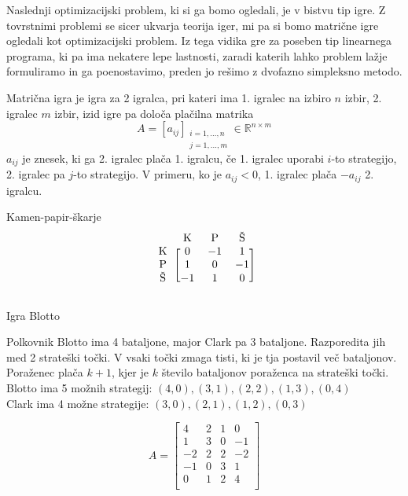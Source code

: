 \documentclass[11pt, a4paper]{article}
\begin{document}
    Naslednji optimizacijski problem, ki si ga bomo ogledali, je v bistvu tip igre. Z tovrstnimi problemi se sicer ukvarja teorija iger, mi pa si bomo matrične igre ogledali kot optimizacijski problem. Iz tega vidika gre za poseben tip linearnega programa, ki pa ima nekatere lepe lastnosti, zaradi katerih lahko problem lažje formuliramo in ga poenostavimo, preden jo rešimo z dvofazno simpleksno metodo.

    \begin{definition}
        Matrična igra je igra za 2 igralca, pri kateri ima 1. igralec na izbiro \(n\) izbir, 2. igralec \(m\) izbir, izid igre pa določa plačilna matrika
        \[A=[a_{ij}]_{\substack{ i=1,...,n \\ j=1,...,m} } \in \mathbb{R}^{n \times m}\]
        \(a_{ij}\) je znesek, ki ga 2. igralec plača 1. igralcu, če 1. igralec uporabi \(i\)-to strategijo, 2. igralec pa \(j\)-to strategijo. V primeru, ko je \(a_{ij} < 0\), 1. igralec plača \(-a_{ij}\) 2. igralcu.
    \end{definition}

    \begin{example}
        Kamen-papir-škarje
        \[
            \begin{blockarray}{c c c c}
                & \text{K} & \text{P} & \text{Š} \\
                \begin{block}{c [c c c]}
                    \text{K} & 0 & -1 & 1 \\
                    \text{P} & 1 & 0 & -1 \\
                    \text{Š} & -1 & 1 & 0 \\
                \end{block}
            \end{blockarray}
        \]
    \end{example}

    \begin{example}
        Igra Blotto
        \par
        Polkovnik Blotto ima 4 bataljone, major Clark pa 3 bataljone. Razporedita jih med 2 strateški točki. V vsaki točki zmaga tisti, ki je tja postavil več bataljonov. Poraženec plača \(k+1\), kjer je \(k\) število bataljonov poraženca na strateški točki. \\
        Blotto ima 5 možnih strategij: \((4,0),(3,1),(2,2),(1,3),(0,4)\) \\
        Clark ima 4 možne strategije: \((3,0),(2,1),(1,2),(0,3)\)
        
        \[
            A=
            \begin{bmatrix}
                4 & 2 & 1 & 0 \\
                1 & 3 & 0 & -1 \\
                -2 & 2 & 2 & -2 \\
                -1 & 0 & 3 & 1 \\
                0 & 1 & 2 & 4 \\
            \end{bmatrix}    
        \]
    \end{example}
\end{document}
